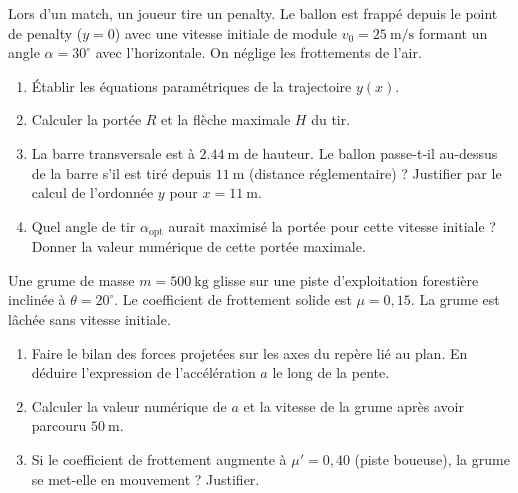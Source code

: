 \documentclass[11pt]{article}
\begin{document}
\begin{exercice}
Lors d'un match, un joueur tire un penalty. Le ballon est frappé depuis le point de penalty ($y=0$) avec une vitesse initiale de module $v_0 = \SI{25}{\meter\per\second}$ formant un angle $\alpha = 30^\circ$ avec l'horizontale. On néglige les frottements de l'air.
\begin{enumerate}
    \item Établir les équations paramétriques de la trajectoire $y(x)$.
    \item Calculer la portée $R$ et la flèche maximale $H$ du tir.
    \item La barre transversale est à $\SI{2,44}{\meter}$ de hauteur. Le ballon passe-t-il au-dessus de la barre s'il est tiré depuis $\SI{11}{\meter}$ (distance réglementaire) ? Justifier par le calcul de l'ordonnée $y$ pour $x = \SI{11}{\meter}$.
    \item Quel angle de tir $\alpha_{\text{opt}}$ aurait maximisé la portée pour cette vitesse initiale ? Donner la valeur numérique de cette portée maximale.
\end{enumerate}
\end{exercice}

\begin{exercice}
Une grume de masse $m = \SI{500}{\kilogram}$ glisse sur une piste d'exploitation forestière inclinée à $\theta = 20^\circ$. Le coefficient de frottement solide est $\mu = 0,15$. La grume est lâchée sans vitesse initiale.
\begin{enumerate}
    \item Faire le bilan des forces projetées sur les axes du repère lié au plan. En déduire l'expression de l'accélération $a$ le long de la pente.
    \item Calculer la valeur numérique de $a$ et la vitesse de la grume après avoir parcouru $\SI{50}{\meter}$.
    \item Si le coefficient de frottement augmente à $\mu' = 0,40$ (piste boueuse), la grume se met-elle en mouvement ? Justifier.
\end{enumerate}
\end{exercice}
\end{document}

